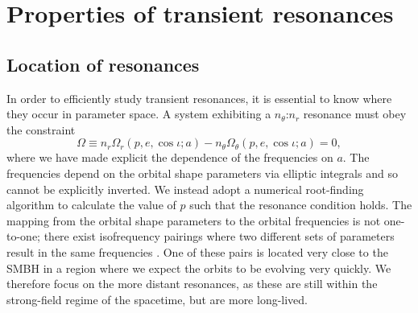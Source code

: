 

\section{Properties of transient resonances}

\subsection{Location of resonances}
\label{sec:res-location}
In order to efficiently study transient resonances, it is essential to know where they occur in parameter space. A system exhibiting a $n_\theta$:$n_r$ resonance must obey the constraint
\begin{equation}
\label{eq:res-condition}
\Omega \equiv n_r \Omega_r(p,e,\cos\iota;a) - n_\theta \Omega_\theta(p,e,\cos\iota;a) = 0,
\end{equation}
where we have made explicit the dependence of the frequencies on $a$. The frequencies depend on the orbital shape parameters via elliptic integrals and so cannot be explicitly inverted. We instead adopt a numerical root-finding algorithm to calculate the value of $p$ such that the resonance condition holds. The mapping from the orbital shape parameters to the orbital frequencies is not one-to-one; there exist isofrequency pairings where two different sets of parameters result in the same frequencies \citep{warburton_isofrequency_2013}. One of these pairs is located very close to the SMBH in a region where we expect the orbits to be evolving very quickly. We therefore focus on the more distant resonances, as these are still within the strong-field regime of the spacetime, but are more long-lived.


